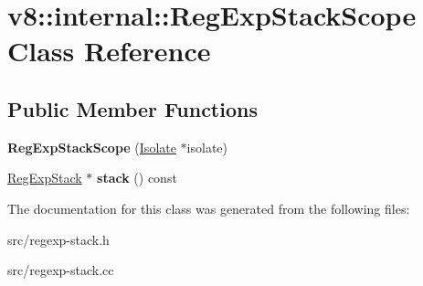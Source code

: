 \hypertarget{classv8_1_1internal_1_1_reg_exp_stack_scope}{}\section{v8\+:\+:internal\+:\+:Reg\+Exp\+Stack\+Scope Class Reference}
\label{classv8_1_1internal_1_1_reg_exp_stack_scope}
\subsection*{Public Member Functions}
\begin{DoxyCompactItemize}
\item 
\hypertarget{classv8_1_1internal_1_1_reg_exp_stack_scope_a7c5e8546faa6a48c189159dd7573d068}{}{\bfseries Reg\+Exp\+Stack\+Scope} (\hyperlink{classv8_1_1internal_1_1_isolate}{Isolate} $\ast$isolate)\label{classv8_1_1internal_1_1_reg_exp_stack_scope_a7c5e8546faa6a48c189159dd7573d068}

\item 
\hypertarget{classv8_1_1internal_1_1_reg_exp_stack_scope_aa1c0c3dbc2641b5aac3c7a15cb292c7f}{}\hyperlink{classv8_1_1internal_1_1_reg_exp_stack}{Reg\+Exp\+Stack} $\ast$ {\bfseries stack} () const \label{classv8_1_1internal_1_1_reg_exp_stack_scope_aa1c0c3dbc2641b5aac3c7a15cb292c7f}

\end{DoxyCompactItemize}


The documentation for this class was generated from the following files\+:\begin{DoxyCompactItemize}
\item 
src/regexp-\/stack.\+h\item 
src/regexp-\/stack.\+cc\end{DoxyCompactItemize}
